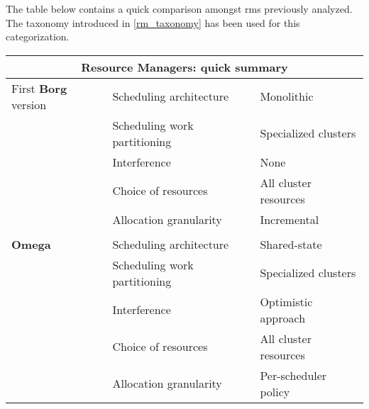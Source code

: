 The table below contains a quick comparison amongst \glspl{rm} previously analyzed.
The taxonomy introduced in \autoref{rm_taxonomy} has been used for this categorization.

\begin{table}[h]
\begin{center}
\begin{tabular}{lll}

\multicolumn{3}{c}{\textbf{Resource Managers: quick summary}} \\ \hline
\multicolumn{1}{l|}{First \textbf{Borg \cite{borg}} version} 
                                   & Scheduling architecture      & Monolithic              \\ \cline{2-3} 
\multicolumn{1}{l|}{}              & Scheduling work partitioning & Specialized clusters    \\ \cline{2-3} 
\multicolumn{1}{l|}{}              & Interference                 & None                    \\ \cline{2-3} 
\multicolumn{1}{l|}{}              & Choice of resources          & All cluster resources   \\ \cline{2-3}  
\multicolumn{1}{l|}{}              & Allocation granularity       & Incremental              \\ \cline{2-3}

\multicolumn{3}{c}{} \\ \hline
\multicolumn{1}{l|}{\textbf{Omega \cite{omega}}} 
                                   & Scheduling architecture      & Shared-state            \\ \cline{2-3} 
\multicolumn{1}{l|}{}              & Scheduling work partitioning & Specialized clusters    \\ \cline{2-3} 
\multicolumn{1}{l|}{}              & Interference                 & Optimistic approach     \\ \cline{2-3} 
\multicolumn{1}{l|}{}              & Choice of resources          & All cluster resources   \\ \cline{2-3} 
\multicolumn{1}{l|}{}              & Allocation granularity       & Per-scheduler policy    \\ \cline{2-3} 


\end{tabular}
\end{center}
\end{table}
